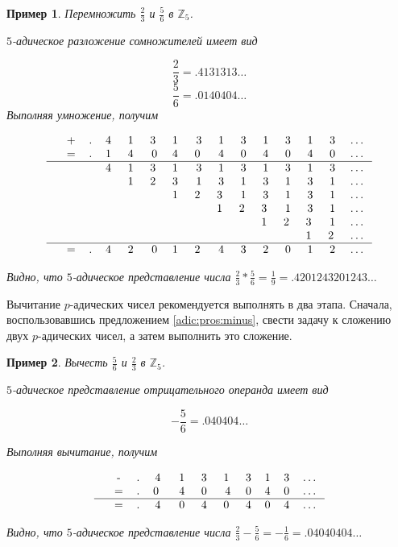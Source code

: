 \documentclass[master, och, diploma, times]{sty/SCWorks}
\theoremstyle{plain}
\newtheorem{exmp}{Пример}[section]
\theoremstyle{definition}
\numberwithin{equation}{section}
\begin{document}
\begin{exmp}
Перемножить $\frac{2}{3}$ и $\frac{5}{6}$ в $\mathbb{Z}_5$.

\noindent $5$-адическое разложение сомножителей имеет вид

$$
\frac{2}{3}=.4131313\dots
$$
$$
\frac{5}{6}=.0140404\dots
$$
Выполняя умножение, получим

$$
\begin{tabular}{ccccccccccccccccc}
& + & . & 4\; & 1\; & 3\; & 1\; & 3 & 1 & 3 & 1 & 3 & 1 & 3 & \dots \\
& = & . & 1\; & 4\; & 0 & 4\; & 0\; & 4 & 0 & 4 & 0 & 4 & 0 & \dots \\
\hline
& & & 4\; & 1\; & 3\; & 1\; & 3 & 1 & 3 & 1 & 3 & 1 & 3 & \dots \\
& & & & 1\; & 2\; & 3\; & 1 & 3 & 1 & 3 & 1 & 3 & 1 & \dots \\
& & & & & & 1\; & 2\; & 3\; & 1 & 3 & 1 & 3 & 1 & \dots \\
& & & & & & & & 1\; & 2\; & 3\; & 1 & 3 & 1 & \dots \\
& & & & & & & & & & 1\; & 2\; & 3\; & 1 &  \dots \\
& & & & & & & & & & & & 1\; & 2\; & \dots \\
\hline
& = & . & 4\; & 2\; & 0 & 1\; & 2\; & 4 & 3 & 2 & 0 & 1 & 2 & \dots \\
\end{tabular}
$$

\noindent Видно, что $5$-адическое представление числа $\frac{2}{3} * \frac{5}{6}=\frac{1}{9}=.4201243201243\dots$
\end{exmp}


Вычитание $p$-адических чисел рекомендуется выполнять в два этапа. Сначала, воспользовавшись предложением \ref{adic:pros:minus}, свести задачу к сложению двух $p$-адических чисел, а затем выполнить это сложение.

\begin{exmp}
Вычесть $\frac{5}{6}$ и $\frac{2}{3}$ в $\mathbb{Z}_5$.

\noindent $5$-адическое представление отрицательного операнда имеет вид

$$
-\frac{5}{6}=.040404\dots
$$

\noindent Выполняя вычитание, получим

$$
\begin{tabular}{cccccccccccc}
& - & . & 4\; & 1\; & 3\; & 1\; & 3 & 1 & 3 & \dots \\
& = & . & 0 \; & 4\; & 0\; & 4 & 0 & 4 & 0 & \dots \\
\hline
& = & . & 4\; & 0\; & 4\; & 0\; & 4 & 0 & 4 & \dots
\end{tabular}
$$

\noindent Видно, что $5$-адическое представление числа $\frac{2}{3} - \frac{5}{6}=-\frac{1}{6}=.04040404\dots$
\end{exmp}
\end{document}
